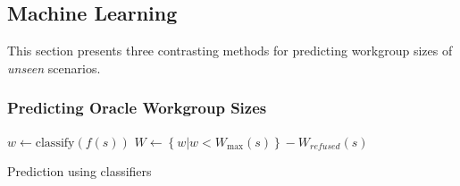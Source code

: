 \subsection{Machine Learning}

This section presents three contrasting methods for predicting
workgroup sizes of \emph{unseen} scenarios.


\subsubsection{Predicting Oracle Workgroup Sizes}

\begin{algorithm}[t]
  \SetAlgoLined

  $w \leftarrow \text{classify}(f(s))$\;
  $W \leftarrow \left\{ w | w < W_{\max}(s) \right\} - W_{refused}(s)$\;
\caption{Prediction using classifiers}
\label{alg:autotune-classification}
\end{algorithm}

